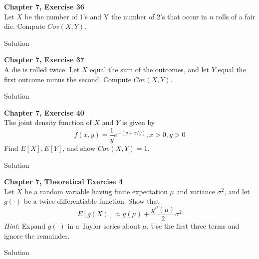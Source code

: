 \documentclass{article}
\begin{document}
\begin{spacing}{1.1}
\maketitle
\newpage
\begin{homeworkProblem}
  {\bf Chapter 7, Exercise 36}\\
  Let $X$ be the number of 1's and Y the number of 2's that occur in 
  $n$ rolls of a fair die. Compute $Cov( X, Y)$.
  \begin{homeworkSection}{Solution}
    
  \end{homeworkSection}
\end{homeworkProblem}

\newpage
\begin{homeworkProblem}
  {\bf Chapter 7, Exercise 37}\\
  A die is rolled twice. Let $X$ equal the sum of the outcomes, and 
  let $Y$ equal the first outcome minus the second. Compute $Cov(X, Y)$.
  \begin{homeworkSection}{Solution}
    
  \end{homeworkSection}
\end{homeworkProblem}

\newpage
\begin{homeworkProblem}
  {\bf Chapter 7, Exercise 40}\\
  The joint density function of $X$ and $Y$ is given by
    \[f( x, y) = \frac{ 1}{ y} e^{-(y + x / y)}, x > 0, y > 0\]
  Find $E[ X], E[ Y]$, and show $Cov( X, Y) = 1$.
  \begin{homeworkSection}{Solution}
    
  \end{homeworkSection}
\end{homeworkProblem}

\newpage
\begin{homeworkProblem}
  {\bf Chapter 7, Theoretical Exercise 4}\\
  Let $X$ be a random variable having finite expectation $\mu$ and 
  variance $\sigma^2$, and let $g(\cdot)$ be a twice differentiable function. 
  Show that
  \[E[ g( X)] \approx g( \mu) + \frac{ g''(\mu)}{ 2} \sigma^2\]
  \emph{Hint}: Expand $g(\cdot)$ in a Taylor series about $\mu$. Use the 
  first three terms and ignore the remainder.
  \begin{homeworkSection}{Solution}
    
  \end{homeworkSection}
\end{homeworkProblem}
  
\end{spacing}
\end{document}
